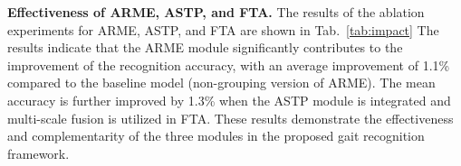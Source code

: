 \documentclass[10pt,twocolumn,letterpaper]{article}
\begin{document}
 \noindent\textbf{Effectiveness of ARME, ASTP, and FTA.} The results of the ablation experiments for ARME, ASTP, and FTA are shown in Tab.~\ref{tab:impact} The results indicate that the ARME module significantly contributes to the improvement of the recognition accuracy, with an average improvement of 1.1\% compared to the baseline model (non-grouping version of ARME). The mean accuracy is further improved by 1.3\% when the ASTP module is integrated and multi-scale fusion is utilized in FTA. These results demonstrate the effectiveness and complementarity of the three modules in the proposed gait recognition framework.


\end{document}
